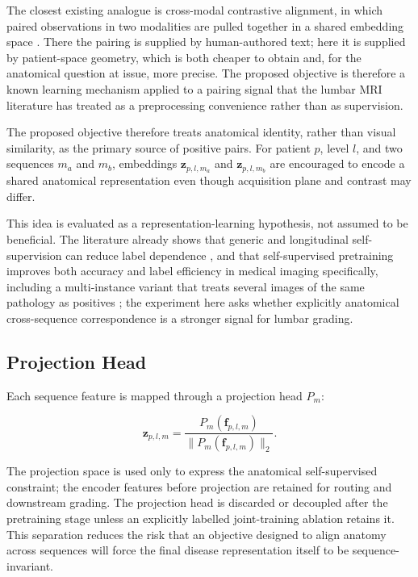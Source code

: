The closest existing analogue is cross-modal contrastive alignment, in which
paired observations in two modalities are pulled together in a shared embedding
space \cite{radford2021learning}. There the pairing is supplied by
human-authored text; here it is supplied by patient-space geometry, which is
both cheaper to obtain and, for the anatomical question at issue, more precise.
The proposed objective is therefore a known learning mechanism applied to a
pairing signal that the lumbar MRI literature has treated as a preprocessing
convenience rather than as supervision.

The proposed objective therefore treats anatomical identity, rather than visual
similarity, as the primary source of positive pairs. For patient $p$, level
$l$, and two sequences $m_a$ and $m_b$, embeddings
$\mathbf{z}_{p,l,m_a}$ and $\mathbf{z}_{p,l,m_b}$ are encouraged to encode a
shared anatomical representation even though acquisition plane and contrast may
differ.

This idea is evaluated as a representation-learning hypothesis, not assumed to
be beneficial. The literature already shows that generic and longitudinal
self-supervision can reduce label dependence
\cite{jamaludin2017selfsupervised,chen2020simple}, and that self-supervised
pretraining improves both accuracy and label efficiency in medical imaging
specifically, including a multi-instance variant that treats several images of
the same pathology as positives \cite{azizi2021big}; the experiment here asks
whether explicitly anatomical cross-sequence correspondence is a stronger
signal for lumbar grading.

\subsection{Projection Head}
\label{sec:method-ssl-projection}

Each sequence feature is mapped through a projection head $P_m$:

\begin{equation}
\mathbf{z}_{p,l,m}=
\frac{
P_m(\mathbf{f}_{p,l,m})
}{
\|P_m(\mathbf{f}_{p,l,m})\|_2
}.
\label{eq:ssl-projection}
\end{equation}

The projection space is used only to express the anatomical self-supervised
constraint; the encoder features before projection are retained for routing and
downstream grading. The projection head is discarded or decoupled after the
pretraining stage unless an explicitly labelled joint-training ablation retains
it. This separation reduces the risk that an objective designed to align
anatomy across sequences will force the final disease representation itself to
be sequence-invariant.

